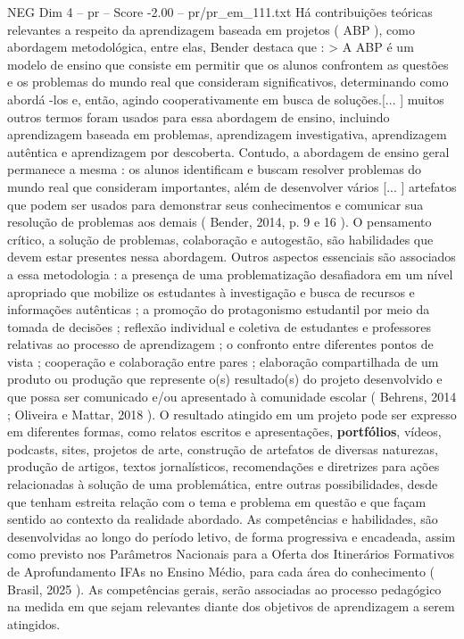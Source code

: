 \begin{textsample}{NEG Dim 4 – pr – Score -2.00 – pr/pr\_em\_111.txt}
Há contribuições teóricas relevantes a respeito da aprendizagem baseada em projetos ( ABP ), como abordagem metodológica, entre elas, Bender destaca que : > A ABP é um modelo de ensino que consiste em permitir que os alunos confrontem as questões e os problemas do mundo real que consideram significativos, determinando como abordá -los e, então, agindo cooperativamente em busca de soluções.[... ] muitos outros termos foram usados para essa abordagem de ensino, incluindo aprendizagem baseada em problemas, aprendizagem investigativa, aprendizagem autêntica e aprendizagem por descoberta.
Contudo, a abordagem de ensino geral permanece a mesma : os alunos identificam e buscam resolver problemas do mundo real que consideram importantes, além de desenvolver vários [... ] artefatos que podem ser usados para demonstrar seus conhecimentos e comunicar sua resolução de problemas aos demais ( Bender, 2014, p. 9 e 16 ).
O pensamento crítico, a solução de problemas, colaboração e autogestão, são habilidades que devem estar presentes nessa abordagem.
Outros aspectos essenciais são associados a essa metodologia : a presença de uma problematização desafiadora em um nível apropriado que mobilize os estudantes à investigação e busca de recursos e informações autênticas ; a promoção do protagonismo estudantil por meio da tomada de decisões ; reflexão individual e coletiva de estudantes e professores relativas ao processo de aprendizagem ; o confronto entre diferentes pontos de vista ; cooperação e colaboração entre pares ; elaboração compartilhada de um produto ou produção que represente o(s) resultado(s) do projeto desenvolvido e que possa ser comunicado e/ou apresentado à comunidade escolar ( Behrens, 2014 ; Oliveira e Mattar, 2018 ).
O resultado atingido em um projeto pode ser expresso em diferentes formas, como relatos escritos e apresentações, \textbf{portfólios}, vídeos, podcasts, sites, projetos de arte, construção de artefatos de diversas naturezas, produção de artigos, textos jornalísticos, recomendações e diretrizes para ações relacionadas à solução de uma problemática, entre outras possibilidades, desde que tenham estreita relação com o tema e problema em questão e que façam sentido ao contexto da realidade abordado.
As competências e habilidades, são desenvolvidas ao longo do período letivo, de forma progressiva e encadeada, assim como previsto nos Parâmetros Nacionais para a Oferta dos Itinerários Formativos de Aprofundamento IFAs no Ensino Médio, para cada área do conhecimento ( Brasil, 2025 ).
As competências gerais, serão associadas ao processo pedagógico na medida em que sejam relevantes diante dos objetivos de aprendizagem a serem atingidos.

\end{textsample}
